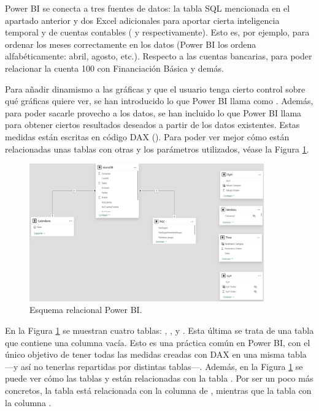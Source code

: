 Power BI se conecta a tres fuentes de datos: la tabla SQL mencionada en el apartado anterior y dos Excel adicionales para aportar cierta inteligencia temporal y de cuentas contables ( y  respectivamente). Esto es, por ejemplo, para ordenar los meses correctamente en los datos (Power BI los ordena alfabéticamente: abril, agosto, etc.). Respecto a las cuentas bancarias, para poder relacionar la cuenta 100 con Financiación Básica y demás.

Para añadir dinamismo a las gráficas y que el usuario tenga cierto control sobre qué gráficas quiere ver, se han introducido lo que Power BI llama como . Además, para poder sacarle provecho a los datos, se han incluido lo que Power BI llama  para obtener ciertos resultados deseados a partir de los datos existentes. Estas medidas están escritas en código DAX (). Para poder ver mejor cómo están relacionadas unas tablas con otras y los parámetros utilizados, véase la Figura \ref{esquemaPowerBI}.

\begin{figure}[H]
    \centering
    \includegraphics[width = 0.9\textwidth]{imgs/esquemaPowerBI.png}
    \caption{Esquema relacional Power BI.}
    \label{esquemaPowerBI}
\end{figure}

En la Figura \ref{esquemaPowerBI} se  muestran cuatro tablas: , , y . Esta última se trata de una tabla  que contiene una columna vacía. Esto es una práctica común en Power BI, con el único objetivo de tener todas las medidas creadas con DAX en una misma tabla ---y así no tenerlas repartidas por distintas tablas---. Además, en la Figura \ref{esquemaPowerBI} se puede ver cómo las tablas  y  están relacionadas con la tabla . Por ser un poco más concretos, la tabla  está relacionada con la columna  de , mientras que la tabla  con la columna .


